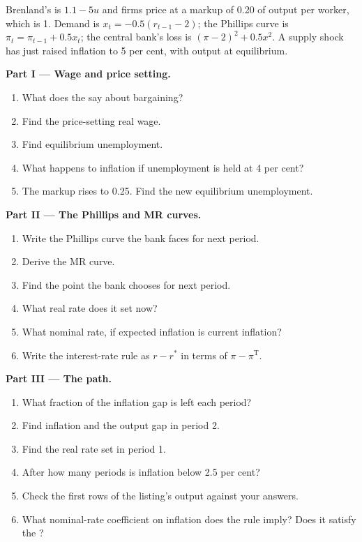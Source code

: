 \begin{problem}
\label{pb:b2:three-equation-model:1}
Brenland's  is $1.1 - 5u$ and firms price at a markup of 0.20 of output per worker, which is 1. Demand is $x_t = -0.5(r_{t-1} - 2)$; the Phillips curve is
$\pi_t = \pi_{t-1} + 0.5x_t$; the central bank's loss is $(\pi - 2)^2 + 0.5x^2$. A supply shock has just raised inflation to 5 per cent, with output at equilibrium.

\medskip
\noindent\textbf{Part I --- Wage and price setting.}
\begin{enumerate}
  \item What does the  say about bargaining?
  \item Find the price-setting real wage.
  \item Find equilibrium unemployment.
  \item What happens to inflation if unemployment is held at 4 per cent?
  \item The markup rises to 0.25. Find the new equilibrium unemployment.
\end{enumerate}

\medskip
\noindent\textbf{Part II --- The Phillips and MR curves.}
\begin{enumerate}[resume]
  \item Write the Phillips curve the bank faces for next period.
  \item Derive the MR curve.
  \item Find the point the bank chooses for next period.
  \item What real rate does it set now?
  \item What nominal rate, if expected inflation is current inflation?
  \item Write the interest-rate rule as $r - r^*$ in terms of $\pi - \pi^{\mathrm T}$.
\end{enumerate}

\medskip
\noindent\textbf{Part III --- The path.}
\begin{enumerate}[resume]
  \item What fraction of the inflation gap is left each period?
  \item Find inflation and the output gap in period 2.
  \item Find the real rate set in period 1.
  \item After how many periods is inflation below 2.5 per cent?
  \item Check the first rows of the listing's output against your answers.
  \item What nominal-rate coefficient on inflation does the rule imply? Does it satisfy the ?
\end{enumerate}


\end{problem}
